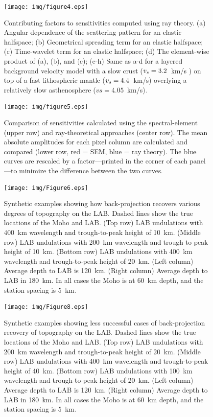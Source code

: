 \documentclass[referee]{gji}
\begin{document}
\begin{figure}
\centering
\texttt{[image: img/figure4.eps]}
\caption{Contributing factors to sensitivities computed using ray theory. (a) Angular dependence of the scattering pattern for an elastic halfspace; (b) Geometrical spreading term for an elastic halfspace; (c) Time-wavelet term for an elastic halfspace; (d) The element-wise product of (a), (b), and (c); (e-h) Same as a-d for a layered background velocity model with a slow crust ($v_s = 3.2$~km/s ) on top of a fast lithospheric mantle ($v_s = 4.4$~km/s) overlying a relatively slow asthenosphere ($vs=4.05$~km/s).}
\label{fig:KernelPieces}
\end{figure}

\begin{figure}
\centering
\texttt{[image: img/figure5.eps]}
\caption{Comparison of sensitivities calculated using the spectral-element (upper row) and ray-theoretical approaches (center row).  The mean absolute amplitudes for each pixel column are calculated and compared (lower row, red = SEM, blue = ray theory).  The blue curves are rescaled by a factor---printed in the corner of each panel---to minimize the difference between the two curves.}
\label{fig:KernelEquivalence}
\end{figure}

\begin{figure}
\centering
\texttt{[image: img/Figure6.eps]}
\caption{Synthetic examples showing how back-projection recovers various degrees of topography on the LAB.
Dashed lines show the true locations of the Moho and LAB.
(Top row) LAB undulations with 400~km wavelength and trough-to-peak height of 10~km.
(Middle row) LAB undulations with 200~km wavelength and trough-to-peak height of 10~km.
(Bottom row) LAB undulations with 400~km wavelength and trough-to-peak height of 20~km.
(Left column) Average depth to LAB is 120~km.
(Right column) Average depth to LAB in 180~km.
In all cases the Moho is at 60~km depth, and the station spacing is 5~km.}
\label{fig:LABStructures}
\end{figure}

\begin{figure}
\centering
\texttt{[image: img/Figure8.eps]}
\caption{Synthetic examples showing less successful cases of back-projection recovery of topography on the LAB.
Dashed lines show the true locations of the Moho and LAB.
(Top row) LAB undulations with 200~km wavelength and trough-to-peak height of 20~km.
(Middle row) LAB undulations with 400~km wavelength and trough-to-peak height of 40~km.
(Bottom row) LAB undulations with 100~km wavelength and trough-to-peak height of 20~km.
(Left column) Average depth to LAB is 120~km.
(Right column) Average depth to LAB in 180~km.
In all cases the Moho is at 60~km depth, and the station spacing is 5~km.}
\label{fig:BadExamples}
\end{figure}
\end{document}

